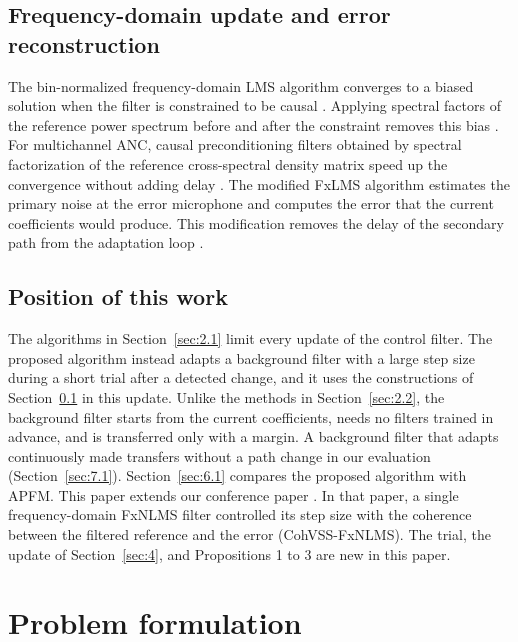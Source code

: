 \documentclass[sip,biber]{now-journal}
\begin{document}
\hypertarget{sec:2.3}{%
\subsection{Frequency-domain update and error reconstruction}\label{sec:2.3}}

The bin-normalized frequency-domain LMS algorithm converges to a biased solution when the filter is constrained to be causal \cite{elliott1997}. Applying spectral factors of the reference power spectrum before and after the constraint removes this bias \cite{elliott2000}. For multichannel ANC, causal preconditioning filters obtained by spectral factorization of the reference cross-spectral density matrix speed up the convergence without adding delay \cite{wang2025}. The modified FxLMS algorithm \cite{bjarnason1992} estimates the primary noise at the error microphone and computes the error that the current coefficients would produce. This modification removes the delay of the secondary path from the adaptation loop \cite{yang2018}.

\hypertarget{sec:2.4}{%
\subsection{Position of this work}\label{sec:2.4}}

The algorithms in Section~\ref{sec:2.1} limit every update of the control filter. The proposed algorithm instead adapts a background filter with a large step size during a short trial after a detected change, and it uses the constructions of Section~\ref{sec:2.3} in this update. Unlike the methods in Section~\ref{sec:2.2}, the background filter starts from the current coefficients, needs no filters trained in advance, and is transferred only with a margin. A background filter that adapts continuously made transfers without a path change in our evaluation (Section~\ref{sec:7.1}). Section~\ref{sec:6.1} compares the proposed algorithm with APFM. This paper extends our conference paper \cite{sugiura2026}. In that paper, a single frequency-domain FxNLMS filter controlled its step size with the coherence between the filtered reference and the error (CohVSS-FxNLMS). The trial, the update of Section~\ref{sec:4}, and Propositions 1 to 3 are new in this paper.

\hypertarget{sec:3}{%
\section{Problem formulation}\label{sec:3}}
\end{document}
